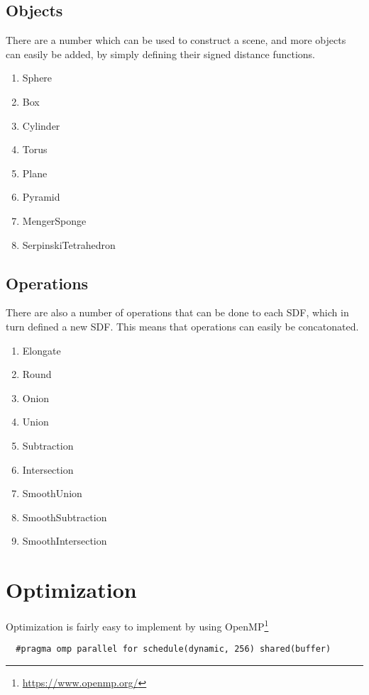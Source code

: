 \documentclass{amsart}
\begin{document}
\subsection{Objects}%
\label{sub:Objects}

There are a number which can be used to construct a scene, and more objects can
easily be added, by simply defining their signed distance functions.

\begin{enumerate}
  \item Sphere
  \item Box
  \item Cylinder
  \item Torus
  \item Plane
  \item Pyramid
  \item MengerSponge
  \item SerpinskiTetrahedron
\end{enumerate}

\subsection{Operations}%
\label{sub:Operations}

There are also a number of operations that can be done to each SDF, which in
turn defined a new SDF. This means that operations can easily be concatonated.

\begin{enumerate}
  \item Elongate
  \item Round
  \item Onion
  \item Union
  \item Subtraction
  \item Intersection
  \item SmoothUnion
  \item SmoothSubtraction
  \item SmoothIntersection
\end{enumerate}

\section{Optimization}%
\label{sec:Optimization}

Optimization is fairly easy to implement by using
OpenMP\footnote{\url{https://www.openmp.org/}}

\begin{verbatim}
  #pragma omp parallel for schedule(dynamic, 256) shared(buffer)
\end{verbatim}
\end{document}
